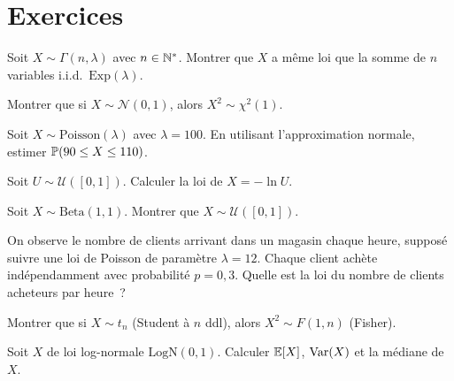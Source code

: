 \section{Exercices}

\begin{exercice}
Soit $X \sim \Gamma(n, \lambda)$ avec $n \in \mathbb{N}^*$. Montrer que $X$ a m\^eme loi
que la somme de $n$ variables i.i.d.\ $\text{Exp}(\lambda)$.
\end{exercice}

\begin{exercice}
Montrer que si $X \sim \mathcal{N}(0,1)$, alors $X^2 \sim \chi^2(1)$.
\end{exercice}

\begin{exercice}
Soit $X \sim \text{Poisson}(\lambda)$ avec $\lambda = 100$. En utilisant
l'approximation normale, estimer $\mathbb{P}(90 \leq X \leq 110)$.
\end{exercice}

\begin{exercice}
Soit $U \sim \mathcal{U}([0,1])$. Calculer la loi de $X = -\ln U$.
\end{exercice}

\begin{exercice}
Soit $X \sim \text{Beta}(1,1)$. Montrer que $X \sim \mathcal{U}([0,1])$.
\end{exercice}

\begin{exercice}
On observe le nombre de clients arrivant dans un magasin chaque heure, suppos\'e
suivre une loi de Poisson de param\`etre $\lambda = 12$. Chaque client ach\`ete
ind\'ependamment avec probabilit\'e $p = 0{,}3$. Quelle est la loi du nombre
de clients acheteurs par heure~?
\end{exercice}

\begin{exercice}
Montrer que si $X \sim t_n$ (Student \`a $n$ ddl), alors $X^2 \sim F(1, n)$
(Fisher).
\end{exercice}

\begin{exercice}
Soit $X$ de loi log-normale $\text{LogN}(0, 1)$. Calculer $\mathbb{E}[X]$, $\mathrm{Var}(X)$
et la m\'ediane de $X$.
\end{exercice}
